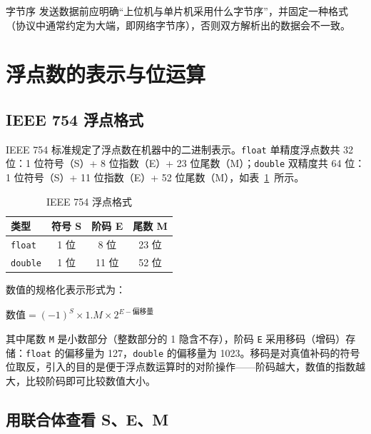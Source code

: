 \begin{anybox}{字节序}
发送数据前应明确“上位机与单片机采用什么字节序”，并固定一种格式（协议中通常约定为大端，即网络字节序），否则双方解析出的数据会不一致。
\end{anybox}

\section{浮点数的表示与位运算}

\subsection{IEEE 754 浮点格式}

IEEE 754 标准规定了浮点数在机器中的二进制表示。\texttt{float} 单精度浮点数共 32 位：1 位符号（S）+ 8 位指数（E）+ 23 位尾数（M）；\texttt{double} 双精度共 64 位：1 位符号（S）+ 11 位指数（E）+ 52 位尾数（M），如表~\ref{tab:ieee}~所示。

\begin{table}[htbp]
\centering \caption{IEEE 754 浮点格式} \label{tab:ieee}
    \begin{tabular}{lccc}
        \toprule
        类型 & 符号 S & 阶码 E & 尾数 M \\
        \midrule
        \texttt{float}  & 1 位 & 8 位  & 23 位 \\
        \texttt{double} & 1 位 & 11 位 & 52 位 \\
        \bottomrule
    \end{tabular}
\end{table}

数值的规格化表示形式为：

\begin{center}
$\text{数值} = (-1)^{S} \times 1.M \times 2^{E - 偏移量}$
\end{center}

其中尾数 \texttt{M} 是小数部分（整数部分的 1 隐含不存），阶码 \texttt{E} 采用移码（增码）存储：\texttt{float} 的偏移量为 127，\texttt{double} 的偏移量为 1023。移码是对真值补码的符号位取反，引入的目的是便于浮点数运算时的对阶操作——阶码越大，数值的指数越大，比较阶码即可比较数值大小。

\subsection{用联合体查看 S、E、M}

